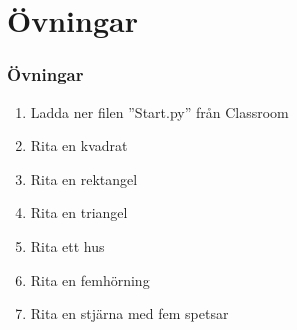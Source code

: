 \documentclass[aspectratio=169]{beamer}
\begin{document}
\section{Övningar}

\begin{frame}
	\frametitle{Övningar}
	
	\begin{enumerate}
		\item Ladda ner filen ''Start.py'' från Classroom
		\item Rita en kvadrat
		\item Rita en rektangel
		\item Rita en triangel
		\item Rita ett hus
		\item Rita en femhörning
		\item Rita en stjärna med fem spetsar
	\end{enumerate}

\end{frame}
\end{document}
